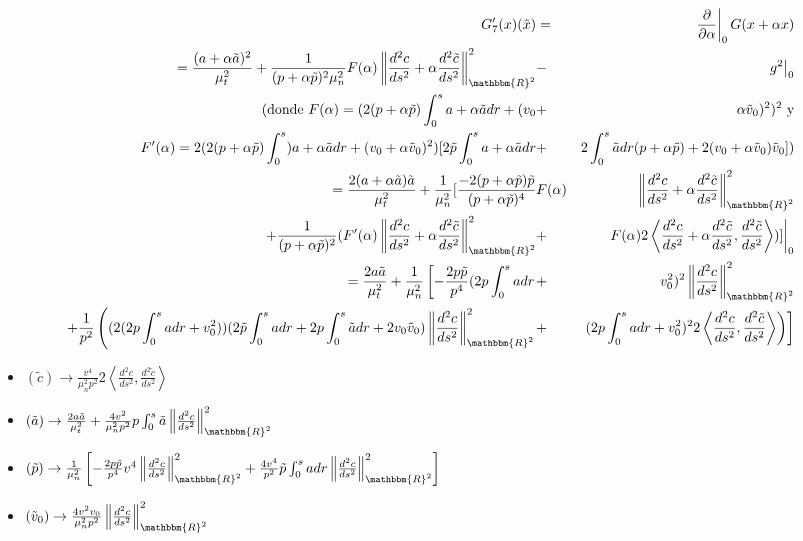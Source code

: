 \documentclass[a4paper,10pt]{book}
\newcommand{\R}{\mathbbm{R}}
\newcommand{\arr}{\rightarrow}
\newcommand{\la}{\langle}
\newcommand{\ra}{\rangle}
\begin{document}
\begin{eqnarray*}
G_7'(x)(\tilde{x})&=&\left.\frac{\partial}{\partial\alpha}\right|_0 G(x+\alpha x)\\
=\frac{(a+\alpha\tilde{a})^2}{\mu_t^2}+\frac{1}{(p+\alpha\tilde{p})^2\mu_n^2}F(\alpha)\left\|\frac{d^2c}{ds^2}+\alpha\frac{d^2\tilde{c}}{ds^2}\right\|_{\R^2}^2&-&\left.g^2\right|_0\\
(\mbox{donde }F(\alpha)=(2(p+\alpha\tilde{p})\int_0^s a+\alpha\tilde{a}dr+(v_0&+&\alpha\tilde{v}_0)^2)^2\mbox{ y}\\
F'(\alpha)=2(2(p+\alpha\tilde{p})\int_0^s) a+\alpha\tilde{a}dr+(v_0+\alpha\tilde{v}_0)^2)[2\tilde{p}\int_0^s a+\alpha\tilde{a}dr&+&2\int_0^s\tilde{a}dr(p+\alpha\tilde{p})+2(v_0+\alpha\tilde{v}_0)\tilde{v}_0])\\
=\frac{2(a+\alpha\tilde{a})\tilde{a}}{\mu_t^2}+\frac{1}{\mu_n^2}[\frac{-2(p+\alpha\tilde{p})\tilde{p}}{(p+\alpha\tilde{p})^4}&F(\alpha)&\left\|\frac{d^2c}{ds^2}+\alpha\frac{d^2\tilde{c}}{ds^2}\right\|_{\R^2}^2\\
+\frac{1}{(p+\alpha\tilde{p})^2}(F'(\alpha)\left\|\frac{d^2c}{ds^2}+\alpha\frac{d^2\tilde{c}}{ds^2}\right\|_{\R^2}^2&+&\left.F(\alpha)2\left\la \frac{d^2c}{ds^2}+\alpha\frac{d^2\tilde{c}}{ds^2} , \frac{d^2\tilde{c}}{ds^2}\right\ra)]\right|_0\\
=\frac{2a\tilde{a}}{\mu_t^2}+\frac{1}{\mu_n^2}\left[-\frac{2p\tilde{p}}{p^4}(2p\int_0^s adr\right.&+&v_0^2)^2\left\|\frac{d^2c}{ds^2}\right\|_{\R^2}^2\\
+\frac{1}{p^2}\left((2(2p\int_0^s adr+v_0^2))(2\tilde{p}\int_0^s adr+2p\int_0^s\tilde{a}dr+2v_0\tilde{v}_0)\left\|\frac{d^2c}{ds^2}\right\|_{\R^2}^2\right.&+&\left.\left.(2p\int_0^s adr+v_0^2)^22\left\la \frac{d^2c}{ds^2} , \frac{d^2\tilde{c}}{ds^2}\right\ra\right)\right]\\
\end{eqnarray*}

\begin{itemize}
 \item$(\tilde{c})\arr\frac{v^4}{\mu_n^2p^2}2\left\la \frac{d^2c}{ds^2} , \frac{d^2\tilde{c}}{ds^2}\right\ra$
 \item$(\tilde{a})\arr\frac{2a\tilde{a}}{\mu_t^2}+\frac{4v^2}{\mu_n^2p^2}p\int_0^s\tilde{a}\left\|\frac{d^2c}{ds^2}\right\|_{\R^2}^2$
 \item$(\tilde{p})\arr\frac{1}{\mu_n^2}\left[-\frac{2p\tilde{p}}{p^4}v^4\left\|\frac{d^2c}{ds^2}\right\|_{\R^2}^2+\frac{4v^4}{p^2}\tilde{p}\int_0^s adr\left\|\frac{d^2c}{ds^2}\right\|_{\R^2}^2\right]$
 \item$(\tilde{v}_0)\arr\frac{4v^2v_0}{\mu_n^2p^2}\left\|\frac{d^2c}{ds^2}\right\|_{\R^2}^2$
\end{itemize}
    
\end{document}
